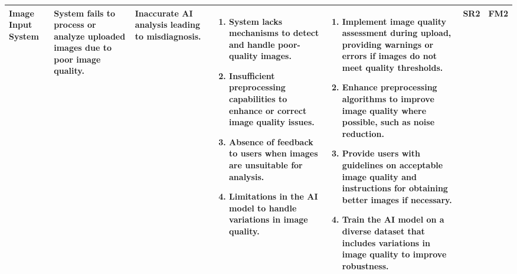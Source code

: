 \documentclass{article}
\begin{document}
\begin{landscape}
\begin{table}[ht]
{\begin{tabular}{|p{2.5cm}|p{2.5cm}|p{3cm}|p{5cm}|p{6cm}|p{1cm}|p{1cm}|}
    Image Input System
     & System fails to process or analyze uploaded images due to poor image quality.
     & Inaccurate AI analysis leading to misdiagnosis.
     &
     \begin{enumerate}[leftmargin=*, label={\alph*.}, itemsep=1pt]
         \item System lacks mechanisms to detect and handle poor-quality images.
         \item Insufficient preprocessing capabilities to enhance or correct image quality issues.
         \item Absence of feedback to users when images are unsuitable for analysis.
         \item Limitations in the AI model to handle variations in image quality.
     \end{enumerate}
     &
     \begin{enumerate}[leftmargin=*, label={\alph*.}, itemsep=1pt]
         \item Implement image quality assessment during upload, providing warnings or errors if images do not meet quality thresholds.
         \item Enhance preprocessing algorithms to improve image quality where possible, such as noise reduction.
         \item Provide users with guidelines on acceptable image quality and instructions for obtaining better images if necessary.
         \item Train the AI model on a diverse dataset that includes variations in image quality to improve robustness.
     \end{enumerate}
     & SR2 & FM2 \\ \hline

    \end{tabular}
    }
    \end{table}
\end{landscape}
\end{document}
